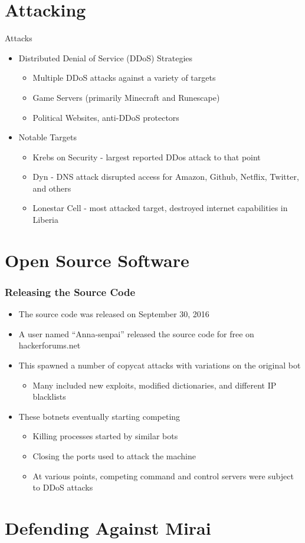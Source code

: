 \documentclass{beamer}
\begin{document}
\section{Attacking}

\begin{frame}{Attacks}
	\begin{itemize}
		\item<+->Distributed Denial of Service (DDoS) Strategies
			\begin{itemize}
				\item<+->Multiple DDoS attacks against a variety of targets
				\item<+->Game Servers (primarily Minecraft and Runescape)
				\item<+->Political Websites, anti-DDoS protectors
			\end{itemize}
		\item<+->Notable Targets
			\begin{itemize}
				\item<+->Krebs on Security - largest reported DDos attack to that point
				\item<+->Dyn - DNS attack disrupted access for Amazon, Github, Netflix, Twitter, and others
				\item<+->Lonestar Cell - most attacked target, destroyed internet capabilities in Liberia
			\end{itemize}
	\end{itemize}
\end{frame}

\section{Open Source Software}

\begin{frame}
	\frametitle{Releasing the Source Code}
	\begin{itemize}
		\item<+-> The source code was released on September 30, 2016
		\item<+-> A user named ``Anna-senpai'' released the source code for free on hackerforums.net
		\item<+-> This spawned a number of copycat attacks with variations on the original bot
		\begin{itemize}
			\item<+-> Many included new exploits, modified dictionaries, and different IP blacklists
		\end{itemize}
		\item<+-> These botnets eventually starting competing
		\begin{itemize}
			\item<+-> Killing processes started by similar bots
			\item<+-> Closing the ports used to attack the machine
			\item<+-> At various points, competing command and control servers were subject to DDoS attacks
		\end{itemize}
	\end{itemize}
\end{frame}

\section{Defending Against Mirai}
\end{document}

